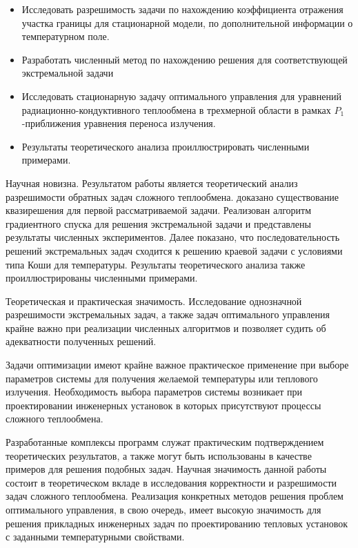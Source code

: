 \documentclass[10pt]{article}
\begin{document}
\begin{itemize}
  \item Исследовать разрешимость задачи по нахождению коэффициента отражения участка границы для стационарной модели, по дополнительной информации о температурном поле.

  \item Разработать численный метод по нахождению решения для соответствующей экстремальной задачи

  \item Исследовать стационарную задачу оптимального управления для уравнений радиационно-кондуктивного теплообмена в трехмерной области в рамках $P_{1}$-приближения уравнения переноса излучения.

  \item Результаты теоретического анализа проиллюстрировать численными примерами.

\end{itemize}

Научная новизна. Результатом работы является теоретический анализ разрешимости обратных задач сложного теплообмена. доказано существование квазирешения для первой рассматриваемой задачи. Реализован алгоритм градиентного спуска для решения экстремальной задачи и представлены результаты численных экспериментов. Далее показано, что последовательность решений экстремальных задач сходится к решению краевой задачи с условиями типа Коши для температуры. Результаты теоретического анализа также проиллюстрированы численными примерами.

Теоретическая и практическая значимость. Исследование однозначной разрешимости экстремальных задач, а также задач оптимального управления крайне важно при реализации численных алгоритмов и позволяет судить об адекватности полученных решений.

Задачи оптимизации имеют крайне важное практическое применение при выборе параметров системы для получения желаемой температуры или теплового излучения. Необходимость выбора параметров системы возникает при проектировании инженерных установок в которых присутствуют процессы сложного теплообмена.

Разработанные комплексы программ служат практическим подтверждением теоретических результатов, а также могут быть использованы в качестве примеров для решения подобных задач. Научная значимость данной работы состоит в теоретическом вкладе в исследования корректности и разрешимости задач сложного теплообмена. Реализация конкретных методов решения проблем оптимального управления, в свою очередь, имеет высокую значимость для решения прикладных инженерных задач по проектированию тепловых установок с заданными температурными свойствами.
\end{document}
